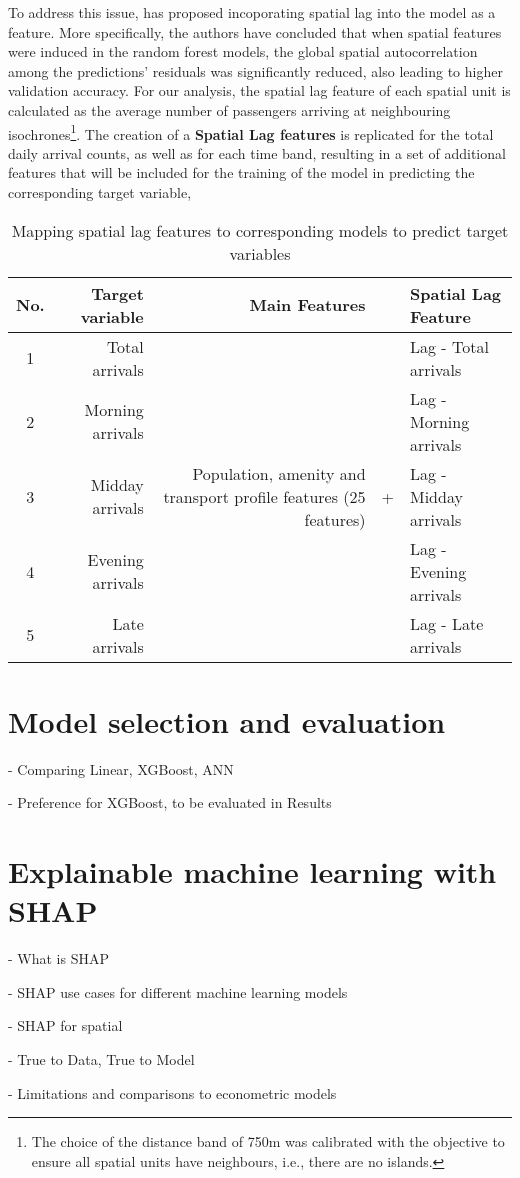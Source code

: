 To address this issue, \citet{liuIncorporatingSpatialAutocorrelation2022} has proposed incoporating spatial lag into the model as a feature. More specifically, the authors have concluded that when spatial features were induced in the random forest models, the global spatial autocorrelation among the predictions' residuals was significantly reduced, also leading to higher validation accuracy. For our analysis, the spatial lag feature of each spatial unit is calculated as the average number of passengers arriving at neighbouring isochrones\footnote{The choice of the distance band of 750m was calibrated with the objective to ensure all spatial units have neighbours, i.e., there are no islands.}. The creation of a \textbf{Spatial Lag features} is replicated for the total daily arrival counts, as well as for each time band, resulting in a set of additional features that will be included for the training of the model in predicting the corresponding target variable,

\begin{table}[ht]
    \centering
    \renewcommand{\arraystretch}{1.5}
    \begin{tabular}{|c r || r c l|}
        \hline
        \rowcolor{lightgray}
        \textbf{No.} & \textbf{Target variable} & \textbf{Main Features} & &\textbf{Spatial Lag Feature}\\
        
        \hline
        1 & Total arrivals  &  \multirow{5}{12em}{Population, amenity and transport profile features (25 features)} 
                                &  \multirow{5}{*}{+}       &   Lag - Total arrivals    \\ 
        2 & Morning arrivals    &                       &   &   Lag - Morning arrivals  \\ 
        3 & Midday arrivals     &                       &   &   Lag - Midday arrivals   \\ 
        4 & Evening arrivals    &                       &   &   Lag - Evening arrivals  \\ 
        5 & Late arrivals       &                       &   &   Lag - Late arrivals     \\
        \hline
    \end{tabular}
    \caption{Mapping spatial lag features to corresponding models to predict target variables}
    \label{tab:spatiallag}
\end{table}




\pagebreak %
\section{Model selection and evaluation}
- Comparing Linear, XGBoost, ANN

- Preference for XGBoost, to be evaluated in Results

\section{Explainable machine learning with SHAP}
 - What is SHAP 
 
 - SHAP use cases for different machine learning models

 - SHAP for spatial

 - True to Data, True to Model

 - Limitations and comparisons to econometric models

